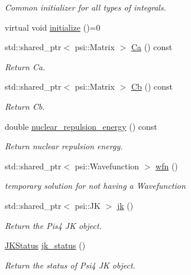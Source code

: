\begin{DoxyCompactItemize}
\begin{DoxyCompactList}\small\item\em Common initializer for all types of integrals. \end{DoxyCompactList}\item 
virtual void \mbox{\hyperlink{classforte_1_1_forte_integrals_a7862835fa0f5f9abe13dfcd6730fa4be}{initialize}} ()=0
\item 
std\+::shared\+\_\+ptr$<$ psi\+::\+Matrix $>$ \mbox{\hyperlink{classforte_1_1_forte_integrals_a4607d886e1224bc0b0db9b9a5fe44edb}{Ca}} () const
\begin{DoxyCompactList}\small\item\em Return Ca. \end{DoxyCompactList}\item 
std\+::shared\+\_\+ptr$<$ psi\+::\+Matrix $>$ \mbox{\hyperlink{classforte_1_1_forte_integrals_a99ae31009f9c83f1c7b5871e9dcdcffe}{Cb}} () const
\begin{DoxyCompactList}\small\item\em Return Cb. \end{DoxyCompactList}\item 
double \mbox{\hyperlink{classforte_1_1_forte_integrals_ae83c6f8ee941902655eb8dd27b993e2d}{nuclear\+\_\+repulsion\+\_\+energy}} () const
\begin{DoxyCompactList}\small\item\em Return nuclear repulsion energy. \end{DoxyCompactList}\item 
std\+::shared\+\_\+ptr$<$ psi\+::\+Wavefunction $>$ \mbox{\hyperlink{classforte_1_1_forte_integrals_af70ab78cbd8726d63bb7cc6e93d82e71}{wfn}} ()
\begin{DoxyCompactList}\small\item\em temporary solution for not having a Wavefunction \end{DoxyCompactList}\item 
std\+::shared\+\_\+ptr$<$ psi\+::\+JK $>$ \mbox{\hyperlink{classforte_1_1_forte_integrals_a863150497a5b64b0617b58c5ff6c1f82}{jk}} ()
\begin{DoxyCompactList}\small\item\em Return the Pis4 JK object. \end{DoxyCompactList}\item 
\mbox{\hyperlink{classforte_1_1_forte_integrals_a5ef066e57ff1494e90669779b1d0ecc2}{J\+K\+Status}} \mbox{\hyperlink{classforte_1_1_forte_integrals_afdaad0b6e254794d8f1911cd786367f0}{jk\+\_\+status}} ()
\begin{DoxyCompactList}\small\item\em Return the status of Psi4 JK object. \end{DoxyCompactList}\item 

\end{DoxyCompactItemize}
